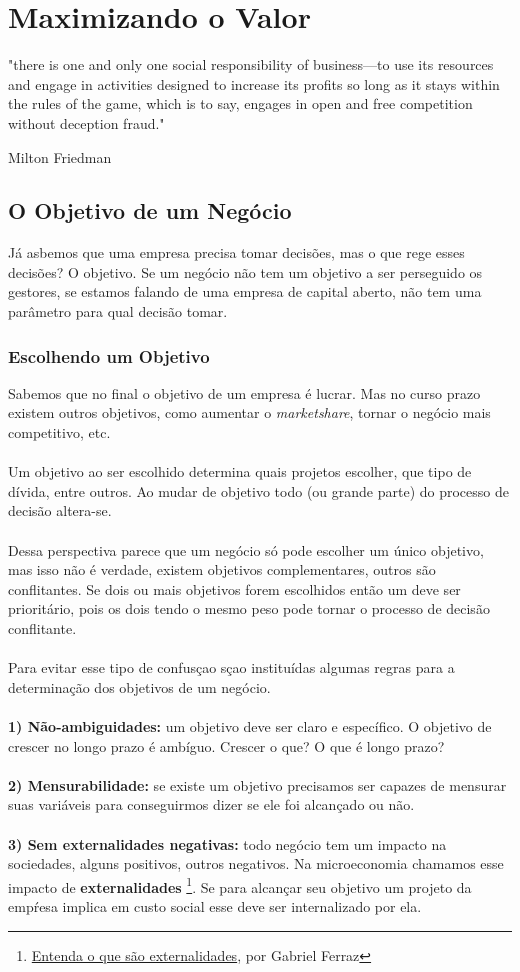\chapter{Maximizando o Valor}
\epigraph{"there is one and only one social responsibility of business—to use its resources and engage in activities designed to increase its profits so long as it stays within the rules of the game, which is to say, engages in open and free competition without deception fraud."}{Milton Friedman}
\section{O Objetivo de um Negócio}
Já asbemos que uma empresa precisa tomar decisões, mas o que rege esses decisões? O objetivo. Se um negócio não tem um objetivo a ser perseguido os gestores, se estamos falando de uma empresa de capital aberto, não tem uma parâmetro para qual decisão tomar.
\subsection*{Escolhendo um Objetivo}
Sabemos que no final o objetivo de um empresa é lucrar. Mas no curso prazo existem outros objetivos, como aumentar o \textit{marketshare}, tornar o negócio mais competitivo, etc.
\\~\\
Um objetivo ao ser escolhido determina quais projetos escolher, que tipo de dívida, entre outros. Ao mudar de objetivo todo (ou grande parte) do processo de decisão altera-se.
\\~\\
Dessa perspectiva parece que um negócio só pode escolher um único objetivo, mas isso não é verdade, existem objetivos complementares, outros são conflitantes. Se dois ou mais objetivos forem escolhidos então um deve ser prioritário, pois os dois tendo o mesmo peso pode tornar o processo de decisão conflitante.
\\~\\
Para evitar esse tipo de confusçao sçao instituídas algumas regras para a determinação dos objetivos de um negócio.
\\~\\
\textbf{1) Não-ambiguidades:} um objetivo deve ser claro e específico. O objetivo de crescer no longo prazo é ambíguo. Crescer o que? O que é longo prazo?
\\~\\
\textbf{2) Mensurabilidade:} se existe um objetivo precisamos ser capazes de mensurar suas variáveis para conseguirmos dizer se ele foi alcançado ou não.
\\~\\
\textbf{3) Sem externalidades negativas:} todo negócio tem um impacto na sociedades, alguns positivos, outros negativos. Na microeconomia chamamos esse impacto de \textbf{externalidades} \footnote{\href{https://economiamainstream.com.br/artigo/entenda-o-que-sao-externalidades/}{Entenda o que são externalidades}, por Gabriel Ferraz}. Se para alcançar seu objetivo um projeto da empŕesa implica em custo social esse deve ser internalizado por ela.
